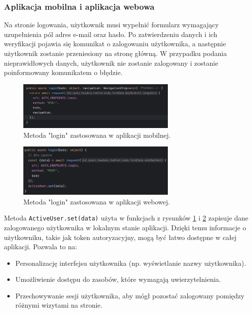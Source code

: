 \subsubsection{Aplikacja mobilna i aplikacja webowa}
Na stronie logowania, użytkownik musi wypełnić formularz wymagający uzupełnienia pól adres e-mail oraz hasło. Po zatwierdzeniu danych i ich weryfikacji pojawia się komunikat o zalogowaniu użytkownika, a następnie użytkownik zostanie przeniesiony na stronę główną. W przypadku podania nieprawidłowych danych, użytkownik nie zostanie zalogowany i zostanie poinformowany komunikatem o błędzie.

\begin{figure}[H]
    \centering
    \includegraphics[width=0.7\textwidth]{chapters/chapter_8/screens/logowanie_mobile}
    \caption{Metoda "login" zastosowana w aplikacji mobilnej.}
    \label{img:logowanie_mobile}
\end{figure}

\begin{figure}[H]
    \centering
    \includegraphics[width=0.7\textwidth]{chapters/chapter_8/screens/logowanie_web}
    \caption{Metoda "login" zastosowana w aplikacji webowej.}
    \label{img:logowanie_web}
\end{figure}

Metoda \texttt{ActiveUser.set(data)} użyta w funkcjach z rysunków \ref{img:logowanie_mobile} i \ref{img:logowanie_web} zapisuje dane zalogowanego użytkownika w lokalnym stanie aplikacji. Dzięki temu informacje o użytkowniku, takie jak token autoryzacyjny, mogą być łatwo dostępne w całej aplikacji. Pozwala to na:
\begin{itemize}
    \item Personalizację interfejsu użytkownika (np. wyświetlanie nazwy użytkownika).
    \item Umożliwienie dostępu do zasobów, które wymagają uwierzytelnienia.
    \item Przechowywanie sesji użytkownika, aby mógł pozostać zalogowany pomiędzy różnymi wizytami na stronie.
\end{itemize}

